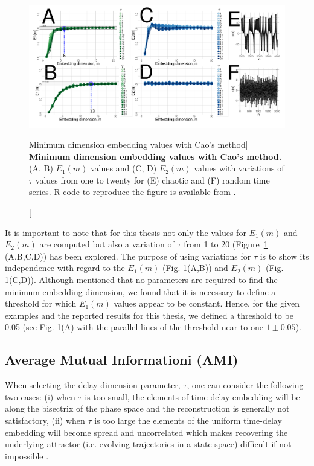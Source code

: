 \begin{figure}[!h]
  \centering
  \includegraphics[width=1.0\textwidth]{cao}
    \caption
	[Minimum dimension embedding values with Cao's method]{
	{\bf Minimum dimension embedding values with Cao's method.} 
	(A, B) $E_1 (m)$ values and (C, D) $E_2(m)$ values 
	with variations of $\tau$ values from one to twenty
	for (E) chaotic and (F) random time series.
	R code to reproduce the figure is available from \cite{hwum2018}.
        }
    \label{fig:e1e2}
\end{figure}

It is important to note that for this thesis not only the values for 
$E_1(m)$ and $E_2(m)$ are computed but also a variation of $\tau$ from 
1 to 20 (Figure~\ref{fig:e1e2} (A,B,C,D)) has been explored. 
The purpose of using variations for $\tau$ is to show its independence 
with regard to the $E_1(m)$ (Fig. \ref{fig:e1e2}(A,B))
and $E_2(m)$ (Fig. \ref{fig:e1e2}(C,D)).
Although \cite{Cao1997} mentioned that no parameters are required to find
the minimum embedding dimension, we found that it is necessary to define a  
threshold for which $E_1(m)$ values appear to be constant. 
Hence, for the given examples and the reported results for this thesis, 
we defined a threshold to be 0.05 
(see Fig. \ref{fig:e1e2}(A) with the parallel lines of the threshold 
near to one $1\pm0.05$).


\subsection{Average Mutual Informationi (AMI)}
When selecting the delay dimension parameter, $\tau$, one can consider the 
following two cases:
(i) when $\tau$ is too small, the elements of time-delay embedding will be 
along the bisectrix of the phase space and the reconstruction is generally 
not satisfactory, 
(ii) when $\tau$ is too large the elements of the uniform 
time-delay embedding will become spread and uncorrelated which makes 
recovering the underlying attractor (i.e. evolving trajectories in a 
state space) difficult if not impossible 
\citep{casdagli1991, emrani2014a, garcia2005e71}.

